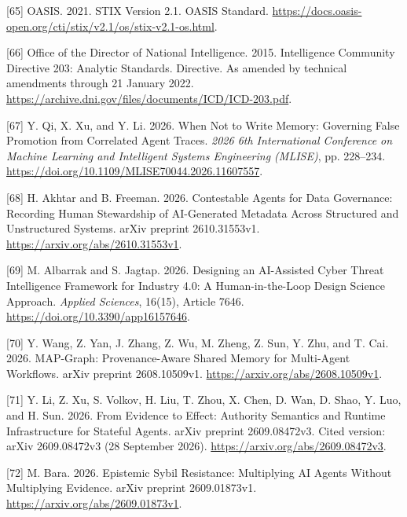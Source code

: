 \documentclass[
  11pt,
]{article}
\newlength{\cslhangindent}
\newlength{\cslentryspacingunit} %
\newenvironment{CSLReferences}[2] %
 {%
  \setlength{\parindent}{0pt}
  \ifodd #1
  \let\oldpar\par
  \def\par{\hangindent=\cslhangindent\oldpar}
  \fi
  \setlength{\parskip}{#2\cslentryspacingunit}
 }%
 {}
\begin{document}
\begin{CSLReferences}{1}{1}
\leavevmode{}%
{[}65{]} OASIS. 2021. STIX Version 2.1. OASIS Standard.
\url{https://docs.oasis-open.org/cti/stix/v2.1/os/stix-v2.1-os.html}.

\leavevmode{}%
{[}66{]} Office of the Director of National Intelligence. 2015.
Intelligence Community Directive 203: Analytic Standards. Directive. As
amended by technical amendments through 21 January 2022.
\url{https://archive.dni.gov/files/documents/ICD/ICD-203.pdf}.

\leavevmode{}%
{[}67{]} Y. Qi, X. Xu, and Y. Li. 2026. When Not to Write Memory:
Governing False Promotion from Correlated Agent Traces. \emph{2026 6th
International Conference on Machine Learning and Intelligent Systems
Engineering (MLISE)}, pp. 228--234.
\url{https://doi.org/10.1109/MLISE70044.2026.11607557}.

\leavevmode{}%
{[}68{]} H. Akhtar and B. Freeman. 2026. Contestable Agents for Data
Governance: Recording Human Stewardship of AI-Generated Metadata Across
Structured and Unstructured Systems. arXiv preprint 2610.31553v1.
\url{https://arxiv.org/abs/2610.31553v1}.

\leavevmode{}%
{[}69{]} M. Albarrak and S. Jagtap. 2026. Designing an AI-Assisted Cyber
Threat Intelligence Framework for Industry 4.0: A Human-in-the-Loop
Design Science Approach. \emph{Applied Sciences}, 16(15), Article 7646.
\url{https://doi.org/10.3390/app16157646}.

\leavevmode{}%
{[}70{]} Y. Wang, Z. Yan, J. Zhang, Z. Wu, M. Zheng, Z. Sun, Y. Zhu, and
T. Cai. 2026. MAP-Graph: Provenance-Aware Shared Memory for Multi-Agent
Workflows. arXiv preprint 2608.10509v1.
\url{https://arxiv.org/abs/2608.10509v1}.

\leavevmode{}%
{[}71{]} Y. Li, Z. Xu, S. Volkov, H. Liu, T. Zhou, X. Chen, D. Wan, D.
Shao, Y. Luo, and H. Sun. 2026. From Evidence to Effect: Authority
Semantics and Runtime Infrastructure for Stateful Agents. arXiv preprint
2609.08472v3. Cited version: arXiv 2609.08472v3 (28 September 2026).
\url{https://arxiv.org/abs/2609.08472v3}.

\leavevmode{}%
{[}72{]} M. Bara. 2026. Epistemic Sybil Resistance: Multiplying AI
Agents Without Multiplying Evidence. arXiv preprint 2609.01873v1.
\url{https://arxiv.org/abs/2609.01873v1}.


\end{CSLReferences}
\end{document}
